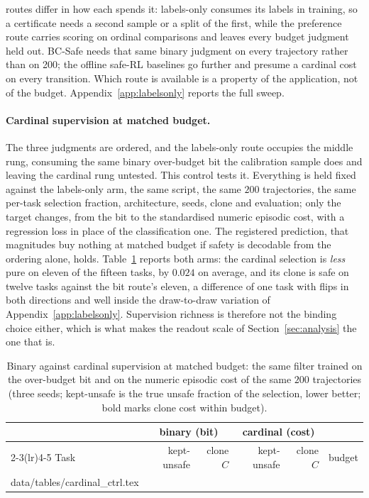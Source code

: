 \documentclass{article} %
\makeatletter
\newcommand{\tabinput}[1]{\@@input#1 }
\makeatother
\begin{document}
routes differ in how each spends it: labels-only consumes its labels in training, so a certificate needs a second sample or a split of the first, while the preference route carries scoring on ordinal comparisons and leaves every budget judgment held out. BC-Safe needs that same binary judgment on every trajectory rather than on 200; the offline safe-RL baselines go further and presume a cardinal cost on every transition. Which route is available is a property of the application, not of the budget. Appendix~\ref{app:labelsonly} reports the full sweep.

\paragraph{Cardinal supervision at matched budget.} The three judgments are ordered, and
the labels-only route occupies the middle rung, consuming the same binary over-budget
bit the calibration sample does and leaving the cardinal rung untested. This control
tests it. Everything is held fixed against the labels-only arm, the same script, the
same $200$ trajectories, the same per-task selection fraction, architecture, seeds,
clone and evaluation; only the target changes, from the bit to the standardised numeric
episodic cost, with a regression loss in place of the classification one. The registered
prediction, that magnitudes buy nothing at matched budget if safety is decodable from
the ordering alone, holds. Table~\ref{tab:cardinalctrl} reports both arms: the cardinal
selection is \emph{less} pure on eleven of the fifteen tasks, by $0.024$ on average,
and its clone is safe on twelve tasks against the bit route's eleven, a difference of
one task with flips in both directions and well inside the draw-to-draw variation of
Appendix~\ref{app:labelsonly}. Supervision richness is therefore not the binding
choice either, which is what makes the readout scale of Section~\ref{sec:analysis} the
one that is.

\begin{table}[h]
\caption{Binary against cardinal supervision at matched budget: the same filter trained
on the over-budget bit and on the numeric episodic cost of the same $200$ trajectories
(three seeds; kept-unsafe is the true unsafe fraction of the selection, lower better;
bold marks clone cost within budget).}
\label{tab:cardinalctrl}
\begin{center}
\scriptsize
\begin{tabular}{l rr rr r}
\toprule
& \multicolumn{2}{c}{binary (bit)} & \multicolumn{2}{c}{cardinal (cost)} & \\
\cmidrule(lr){2-3}\cmidrule(lr){4-5}
Task & kept-unsafe & clone $C$ & kept-unsafe & clone $C$ & budget \\
\midrule
\tabinput{data/tables/cardinal_ctrl.tex}
\bottomrule
\end{tabular}
\end{center}
\end{table}
\end{document}
